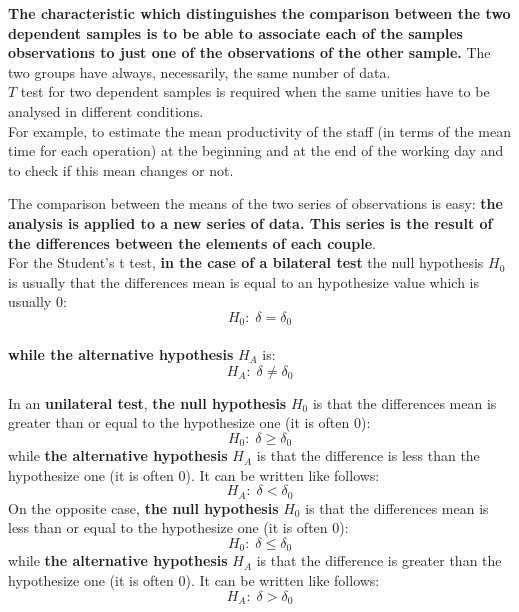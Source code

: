 \begin{frame}
  \vspace*{.25cm}
  \textbf{The characteristic which distinguishes the comparison between the two dependent samples is to be able to associate each of the samples observations to just one of the observations of the other sample.} The two groups have always, necessarily, the same number of data.\\
  \vspace*{.5cm}
  $ T $ test for two dependent samples is required when the same unities have to be analysed in different conditions.\\
  \vspace*{.25cm}
  For example, to estimate the mean productivity of the staff (in terms of the mean time for each operation) at the beginning and at the end of the working day and to check if this mean changes or not.
\end{frame}

\begin{frame}
  \vspace*{.25cm}
  The comparison between the means of the two series of observations is easy: \textbf{the analysis is applied to a new series of data. This series is the result of the differences between the elements of each couple}.\\
  \vspace*{.5cm}
  For the Student's t test, \textbf{in the case of a bilateral test} the null hypothesis $ H_0 $ is usually that the differences mean is equal to an hypothesize value which is usually 0: \\
  $$ H_0: \; \delta = \delta_0 $$\\
  \vspace*{.25cm}
  \textbf{while the alternative hypothesis} {\boldmath$H_A$} is:\\
  $$ H_A: \; \delta \neq \delta_0 $$
  \vspace*{.25cm}
\end{frame}

\begin{frame}
  \vspace*{.1cm}
  In an \textbf{unilateral test}, \textbf{the null hypothesis} $ H_0 $ is that the differences mean is greater than or equal to the hypothesize one (it is often 0):
  $$ H_0:\;\delta \geq \delta_0 $$
  while \textbf{the alternative hypothesis} $ H_A $ is that the difference is less than the hypothesize one (it is often 0). It can be written like follows:
  $$ H_A:\; \delta < \delta_0 $$
  On the opposite case, \textbf{the null hypothesis} $ H_0 $ is that the differences mean is less than or equal to the hypothesize one (it is often 0):
  $$ H_0:\;\delta \leq \delta_0 $$
  while \textbf{the alternative hypothesis} $ H_A $ is that the difference is greater than the hypothesize one (it is often 0). It can be written like follows:
  $$ H_A:\; \delta > \delta_0 $$
\end{frame}

